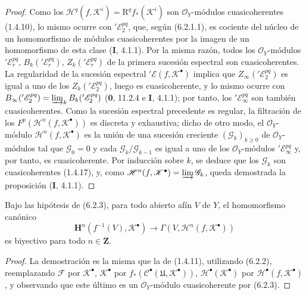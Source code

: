 \begin{proof}
Como los $\mathscr H^q(f,\mathscr K^i)=\mathrm R^q f_*(\mathscr K^i)$ son
$\mathscr O_Y$-módulos cuasicoherentes (1.4.10), lo mismo ocurre con
$'\mathscr E_2^{pq}$, que, según (6.2.1.1), es cociente del núcleo de un
homomorfismo de módulos cuasicoherentes por la imagen de un homomorfismo de
esta clase (\textbf I, 4.1.1). Por la misma razón, todos los
$\mathscr O_Y$-módulos $'\mathscr E_r^{pq}$,
$B_k('\mathscr E_r^{pq})$, $Z_k('\mathscr E_r^{pq})$ de la primera sucesión
espectral son cuasicoherentes. La regularidad de la sucesión espectral
$'\mathscr E(f,\mathscr K^\bullet)$ implica que
$Z_\infty('\mathscr E_2^{pq})$ es igual a uno de los
$Z_k('\mathscr E_2^{pq})$, luego es cuasicoherente, y lo mismo ocurre con
$B_\infty('\mathscr E_2^{pq})=\varinjlim_k B_k('\mathscr E_2^{pq})$
(\textbf 0, 11.2.4 e \textbf I, 4.1.1); por tanto, los $'\mathscr E_\infty^{pq}$ son también
cuasicoherentes. Como la sucesión espectral precedente es regular, la
filtración de los $F^p(\mathscr H^n(f,\mathscr K^\bullet))$ es discreta y
exhaustiva; dicho de otro modo, el $\mathscr O_Y$-módulo
$\mathscr H^n(f,\mathscr K^\bullet)$ es la unión de una sucesión creciente
$(\mathscr G_k)_{k\geq0}$ de $\mathscr O_Y$-módulos tal que
$\mathscr G_0=0$ y cada $\mathscr G_k/\mathscr G_{k-1}$ es igual a uno de los
$\mathscr O_Y$-módulos $'\mathscr E_\infty^{pq}$ y, por tanto, es
cuasicoherente. Por inducción sobre $k$, se deduce que los $\mathscr G_k$ son
cuasicoherentes (1.4.17), y, como
$\mathscr H^n(f,\mathscr K^\bullet)=\varinjlim\mathscr G_k$, queda demostrada
la proposición (\textbf I, 4.1.1).
\end{proof}


\begin{corollary}[6.2.4]
Bajo las hipótesis de (6.2.3), para todo abierto afín $V$ de $Y$, el
homomorfismo canónico
\[
  \mathbf H^n(f^{-1}(V),\mathscr K^\bullet)
  \longrightarrow
  \Gamma(V,\mathscr H^n(f,\mathscr K^\bullet))
  \tag{6.2.4.1}\label{III.6.2.4.1.fr}
\]
es biyectivo para todo $n\in\mathbf Z$.
\end{corollary}

\begin{proof}
La demostración es la misma que la de (1.4.11), utilizando (6.2.2),
reemplazando $\mathscr F$ por $\mathscr K^\bullet$,
$\mathscr K^\bullet$ por
$f_*(\mathscr C^\bullet(\mathfrak U,\mathscr K^\bullet))$,
$\mathscr H^\bullet(\mathscr K^\bullet)$ por
$\mathscr H^\bullet(f,\mathscr K^\bullet)$, y observando que este último es un
$\mathscr O_Y$-módulo cuasicoherente por (6.2.3).
\end{proof}

